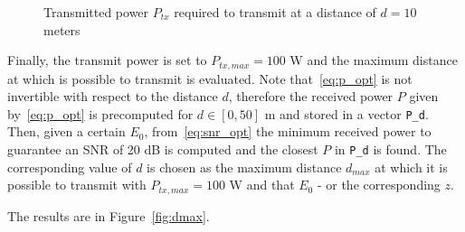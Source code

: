 \documentclass[10pt]{article}
\begin{document}
\begin{figure}[h!]
	\centering
	\caption{Transmitted power $P_{tx}$ required to transmit at a distance of $d = 10$ meters}
	\label{fig:ptx}
\end{figure}

Finally, the transmit power is set to $P_{tx, max} = 100$ W and the maximum distance at which is possible to transmit is evaluated. Note that~\eqref{eq:p_opt} is not invertible with respect to the distance $d$, therefore the received power $P$ given by~\eqref{eq:p_opt} is precomputed for $d \in [0, 50]$ m and stored in a vector \texttt{P\_d}. Then, given a certain $E_0$, from~\eqref{eq:snr_opt} the minimum received power to guarantee an SNR of 20 dB is computed and the closest $P$ in \texttt{P\_d} is found. The corresponding value of $d$ is chosen as the maximum distance $d_{max}$ at which it is possible to transmit with $P_{tx, max} = 100$ W and that $E_0$ - or the corresponding $z$.

The results are in Figure~\ref{fig:dmax}.
\end{document}
